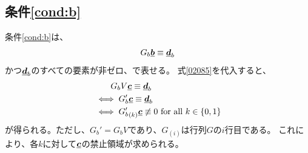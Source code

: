 \documentclass[a4paper,11pt,dvipdfmx]{jsarticle}
\theoremstyle{definition}
\begin{document}
\subsection{条件\ref{cond:b}}
条件\ref{cond:b}は、
\begin{align}
  G_b \underline{\bm{b}} \equiv \underline{\bm{d}}_b\label{02086}
\end{align}
かつ$\underline{\bm{d}}_b$のすべての要素が非ゼロ、で表せる。
式\eqref{02085}を代入すると、
\begin{align}
  &\qquad G_b V\underline{\bm{c}} \equiv \underline{\bm{d}}_b\label{02087}\\
  &\iff G_b'\underline{\bm{c}} \equiv \underline{\bm{d}}_b\label{02088}\\
  &\iff {G_b'}_{(k)}\underline{\bm{c}} \not\equiv 0\text{ for all }k \in \{0,1\}\label{02089}
\end{align}
が得られる。ただし、$G_b' = G_b V$であり、$G_{(i)}$は行列$G$の$i$行目である。
これにより、各$k$に対して$\underline{\bm{c}}$の禁止領域が求められる。

















\end{document}
